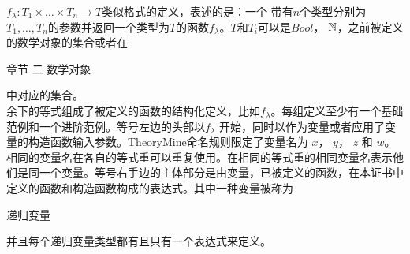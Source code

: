 \documentclass[twocolumn]{article}
\begin{document}
\begin{CJK}{UTF8}{gbsn}

\indent \indent $f_{\lambda} : T_1 \times \ldots \times T_n \rightarrow T$类似格式的定义，表述的是：一个
带有$n$个类型分别为$T_1, \ldots, T_n$的参数并返回一个类型为$T$的函数$f_{\lambda}$。$T$和$T_i$可以是$Bool$， $\mathbb{N}$，之前被定义的数学对象的集合或者在\begin{CJK}{UTF8}{gkai}章节 二 数学对象\end{CJK}中对应的集合。\\


\indent \indent 余下的等式组成了被定义的函数的结构化定义，比如$f_{\lambda}$。每组定义至少有一个基础范例和一个进阶范例。等号左边的头部以$f_{\lambda}$ 开始，同时以作为变量或者应用了变量的构造函数输入参数。TheoryMine命名规则限定了变量名为 $x$， $y$， $z$ 和 $w$。相同的变量名在各自的等式重可以重复使用。在相同的等式重的相同变量名表示他们是同一个变量。等号右手边的主体部分是由变量，已被定义的函数，在本证书中定义的函数和构造函数构成的表达式。其中一种变量被称为\begin{CJK}{UTF8}{gkai}递归变量\end{CJK}并且每个递归变量类型都有且只有一个表达式来定义。\\



\end{CJK}
\end{document}
